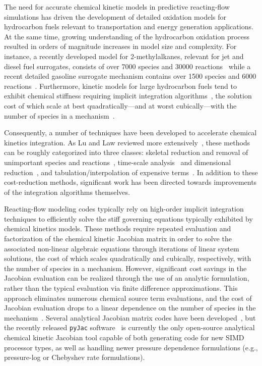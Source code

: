 \documentclass[preprint]{elsarticle}
\begin{document}
The need for accurate chemical kinetic models in predictive reacting-flow simulations has driven the development of detailed oxidation models for hydrocarbon fuels relevant to transportation and energy generation applications.
At the same time, growing understanding of the hydrocarbon oxidation process resulted in orders of magnitude increases in model size and complexity.
For instance, a recently developed model for 2-methylalkanes, relevant for jet and diesel fuel surrogates, consists of over 7000 species and 30000 reactions~\cite{Sarathy:2011kx} while a recent detailed gasoline surrogate mechanism contains over 1500 species and 6000 reactions~\cite{Mehl:2011jn}.
Furthermore, kinetic models for large hydrocarbon fuels tend to exhibit chemical stiffness requiring implicit integration algorithms~\cite{Lu:2009gh}, the solution cost of which scale at best quadratically---and at worst cubically---with the number of species in a mechanism~\cite{Lu:2009gh}.

Consequently, a number of techniques have been developed to accelerate chemical kinetics integration.
As Lu and Law reviewed more extensively~\cite{Lu:2009gh}, these methods can be roughly categorized into three classes: skeletal reduction and removal of unimportant species and reactions~\cite{Lu:2005,Pepiot-Desjardins:2008,Niemeyer:2010bt,Niemeyer:2014,Curtis:2015aa}, time-scale analysis~\cite{qssa,pe_approx1,pe_approx2} and dimensional reduction~\cite{Lam:1988wc,Maas:1992aa,Lu:2001ve}, and tabulation\slash interpolation of expensive terms~\cite{Pope:1997wu,Christo1996}.
In addition to these cost-reduction methods, significant work has been directed towards improvements of the integration algorithms themselves.

Reacting-flow modeling codes typically rely on high-order implicit integration techniques to efficiently solve the stiff governing equations typically exhibited by chemical kinetics models.
These methods require repeated evaluation and factorization of the chemical kinetic Jacobian matrix in order to solve the associated non-linear algebraic equations through iterations of linear system solutions, the cost of which scales quadratically and cubically, respectively, with the number of species in a mechanism.
However, significant cost savings in the Jacobian evaluation can be realized through the use of an analytic formulation, rather than the typical evaluation via finite difference approximations.
This approach eliminates numerous chemical source term evaluations, and the cost of Jacobian evaluation drops to a linear dependence on the number of species in the mechanism~\cite{Lu:2009gh}.
Several analytical Jacobian matrix codes have been developed~\cite{Safta:2011vn,Youssefi:2011tm,Bisetti:2012jw,Perini:2012gy,Dijkmans:2014bb}, but the recently released \texttt{pyJac} software~\cite{Niemeyer:2015im,Niemeyer:2015ws} is currently the only open-source analytical chemical kinetic Jacobian tool capable of both generating code for new SIMD processor types, as well as handling newer pressure dependence formulations (e.g., pressure-log or Chebyshev rate formulations).
\end{document}
